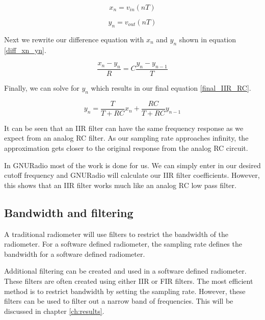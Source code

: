 \begin{equation}\label{input_IIR}
x_n=v_{in}(nT)
\end{equation}

\begin{equation}\label{output_IIR}
y_n=v_{out}(nT)
\end{equation}

Next we rewrite our difference equation with $x_n$ and $y_n$ shown in equation \ref{diff_xn_yn}.

\begin{equation}\label{diff_xn_yn}
\frac{x_n-y_n}{R}=C\frac{y_n-y_{n-1}}{T}
\end{equation}

Finally, we can solve for $y_n$ which results in our final equation \ref{final_IIR_RC}.

\begin{equation}\label{final_IIR_RC}
y_n=\frac{T}{T+RC}x_n+\frac{RC}{T+RC}y_{n-1}
\end{equation}

It can be seen that an IIR filter can have the same frequency response as we expect from an analog RC filter.  As our sampling rate approaches infinity, the approximation gets closer to the original response from the analog RC circuit.  


In GNURadio most of the work is done for us.  We can simply enter in our desired cutoff frequency and GNURadio will calculate our IIR filter coefficients.  However, this shows that an IIR filter works much like an analog RC low pass filter.

\subsection{Bandwidth and filtering}
A traditional radiometer will use filters to restrict the bandwidth of the radiometer.  For a software defined radiometer, the sampling rate defines the bandwidth for a software defined radiometer.  

Additional filtering can be created and used in a software defined radiometer.  These filters are often created using either IIR or FIR filters.  The most efficient method is to restrict bandwidth by setting the sampling rate.  However, these filters can be used to filter out a narrow band of frequencies.  This will be discussed in chapter \ref{ch:results}.

